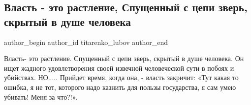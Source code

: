  
 
 
 
 
 
\subsection{Власть - это растление, Спущенный с цепи зверь, скрытый в душе человека}
\label{sec:02_06_2021.fb.titarenko_lubov.1.vlast_chelovek_zver}
\ifcmt
 author_begin
   author_id titarenko_lubov
 author_end
\fi

Власть- это растление. 
Спущенный с цепи зверь, скрытый в душе человека.
Он ищет жадного удовлетворения  своей извечной человеческой сути в побоях и
убийствах.
НО.....
Прийдет время, когда  она, - власть закричит:
«Тут какая то ошибка, я не тот, которого надо казнить для пользы государства, я сам умею убивать! Меня за что?!». 

